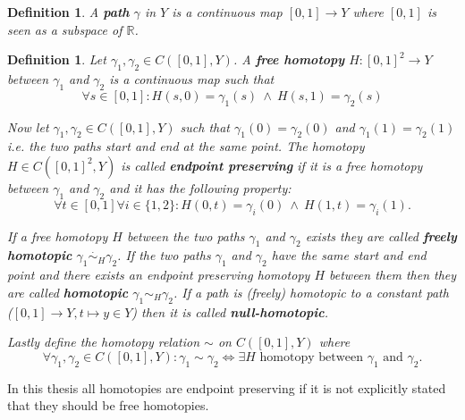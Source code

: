 \documentclass[a4paper, 11pt, twoside]{article}
\newcommand{\R}[0]{\mathbb{R}}
\theoremstyle{break}
\theoremstyle{break}
\newtheorem{defin}[thm]{Definition}
\begin{document}
\begin{defin}
  A \textbf{path} $\gamma$ in $Y$ is a continuous map $[0,1] \to Y$ where $[0,1]$ is seen as a subspace of $\R$.
\end{defin}

\begin{defin}
  Let $\gamma_1, \gamma_2 \in C([0, 1], Y)$. A \textbf{free homotopy} $H\colon [0,1]^2 \to Y$ between $\gamma_1$ and $\gamma_2$ is a continuous map such that
  \begin{equation*}
    \forall s \in [0,1]\colon H(s, 0) = \gamma_1(s) \: \land \: H(s, 1) = \gamma_2(s)
  \end{equation*}

  Now let $\gamma_1, \gamma_2 \in C([0, 1], Y)$ such that $\gamma_1(0) = \gamma_2(0)$ and $\gamma_1(1) = \gamma_2(1)$ i.e. the two paths start and end at the same point.
  The homotopy $H \in C([0,1]^2, Y)$ is called \textbf{endpoint preserving} if it is a free homotopy between $\gamma_1$ and $\gamma_2$ and it has the following property:
  \begin{equation*}
    \forall t\in[0,1]\forall i\in \{1,2\}\colon H(0, t) = \gamma_i(0) \: \land \: H(1, t) = \gamma_i(1).
  \end{equation*}

  If a free homotopy $H$ between the two paths $\gamma_1$ and $\gamma_2$ exists they are called \textbf{freely homotopic} $\gamma_1 \overset{\cdot}{\sim}_H \gamma_2$.
  If the two paths $\gamma_1$ and $\gamma_2$ have the same start and end point and there exists an endpoint preserving homotopy $H$ between them then they are called 
  \textbf{homotopic} $\gamma_1 \sim_H \gamma_2$. If a path is (freely) homotopic to a constant path ($[0,1] \to Y, t \mapsto y \in Y$) then it is called \textbf{null-homotopic}.

  Lastly define the homotopy relation $\sim$ on $C([0,1], Y)$ where 
  \begin{equation*}
    \forall\gamma_1, \gamma_2 \in C([0,1], Y)\colon \gamma_1 \sim \gamma_2 \iff \exists H \text{ homotopy between } \gamma_1 \text{ and } \gamma_2.
  \end{equation*}
\end{defin}

In this thesis all homotopies are endpoint preserving if it is not explicitly stated that they should be free homotopies.
\end{document}

